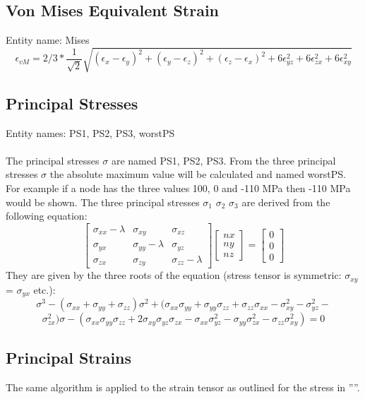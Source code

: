 \documentclass{article}
\begin{document}
\subsection{\label{Von Mises Equivalent Strain}Von Mises Equivalent Strain}
Entity name: Mises\\
\[  \epsilon_{vM} = 2/3 * \frac{1}{\sqrt{2}} \sqrt{(\epsilon_{x}-\epsilon_{y})^{2}+(\epsilon_{y}-\epsilon_{z})^{2}+(\epsilon_{z}-\epsilon_{x})^{2}+6\epsilon_{yz}^{2}+6\epsilon_{zx}^{2}+6\epsilon_{xy}^{2}} \]

\subsection{\label{Principal Stresses}Principal Stresses}
Entity names: PS1, PS2, PS3, worstPS\\\\
The principal stresses $\sigma$ are named PS1, PS2, PS3. From the three principal stresses $\sigma$ the absolute maximum value will be calculated and named worstPS. For example if a node has the three values 100, 0 and -110 MPa then -110 MPa would be shown. The three principal stresses $\sigma_{1}$ $\sigma_{2}$ $\sigma_{3}$ are derived from the following equation:
\[
\left [
\begin{array}{ccc}
\sigma_{xx}-\lambda & \sigma_{xy} & \sigma_{xz}\\
\sigma_{yx} & \sigma_{yy}-\lambda & \sigma_{yz}\\
\sigma_{zx} & \sigma_{zy} & \sigma_{zz}-\lambda
\end{array}
\right ]
\left [
\begin{array}{c}
nx\\
ny\\
nz
\end{array}
\right ]
= 
\left [
\begin{array}{c}
0\\
0\\
0
\end{array}
\right ]
\]
They are given by the three roots of the equation (stress tensor is symmetric: $\sigma_{xy}$ = $\sigma_{yx}$ etc.):
\[ \sigma^3 - (\sigma_{xx}+\sigma_{yy}+\sigma_{zz})\sigma^2 + (\sigma_{xx}\sigma_{yy}+\sigma_{yy}\sigma_{zz}+\sigma_{zz}\sigma_{xx}-\sigma_{xy}^2-\sigma_{yz}^2-\]\[\sigma_{zx}^2)\sigma - (\sigma_{xx}\sigma_{yy}\sigma_{zz}+2\sigma_{xy}\sigma_{yz}\sigma_{zx}-\sigma_{xx}\sigma_{yz}^2-\sigma_{yy}\sigma_{zx}^2-\sigma_{zz}\sigma_{xy}^2)  = 0 \]

\subsection{\label{Principal Strains}Principal Strains}
The same algorithm is applied to the strain tensor as outlined for the stress in ''''.
\end{document}
